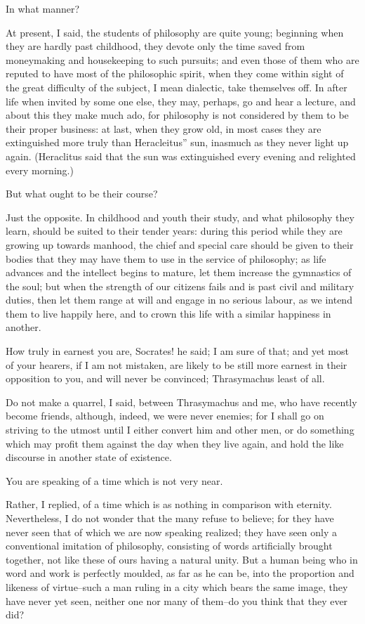 In what manner?

At present, I said, the students of philosophy are quite young;
beginning when they are hardly past childhood, they devote only the time
saved from moneymaking and housekeeping to such pursuits; and even those
of them who are reputed to have most of the philosophic spirit, when
they come within sight of the great difficulty of the subject, I mean
dialectic, take themselves off. In after life when invited by some one
else, they may, perhaps, go and hear a lecture, and about this they make
much ado, for philosophy is not considered by them to be their
proper business: at last, when they grow old, in most cases they are
extinguished more truly than Heracleitus'' sun, inasmuch as they never
light up again. (Heraclitus said that the sun was extinguished every
evening and relighted every morning.)

But what ought to be their course?

Just the opposite. In childhood and youth their study, and what
philosophy they learn, should be suited to their tender years: during
this period while they are growing up towards manhood, the chief and
special care should be given to their bodies that they may have them
to use in the service of philosophy; as life advances and the intellect
begins to mature, let them increase the gymnastics of the soul; but
when the strength of our citizens fails and is past civil and military
duties, then let them range at will and engage in no serious labour,
as we intend them to live happily here, and to crown this life with a
similar happiness in another.

How truly in earnest you are, Socrates! he said; I am sure of that; and
yet most of your hearers, if I am not mistaken, are likely to be still
more earnest in their opposition to you, and will never be convinced;
Thrasymachus least of all.

Do not make a quarrel, I said, between Thrasymachus and me, who have
recently become friends, although, indeed, we were never enemies; for I
shall go on striving to the utmost until I either convert him and other
men, or do something which may profit them against the day when they
live again, and hold the like discourse in another state of existence.

You are speaking of a time which is not very near.

Rather, I replied, of a time which is as nothing in comparison with
eternity. Nevertheless, I do not wonder that the many refuse to believe;
for they have never seen that of which we are now speaking realized;
they have seen only a conventional imitation of philosophy, consisting
of words artificially brought together, not like these of ours having
a natural unity. But a human being who in word and work is perfectly
moulded, as far as he can be, into the proportion and likeness of
virtue--such a man ruling in a city which bears the same image, they
have never yet seen, neither one nor many of them--do you think that
they ever did?

